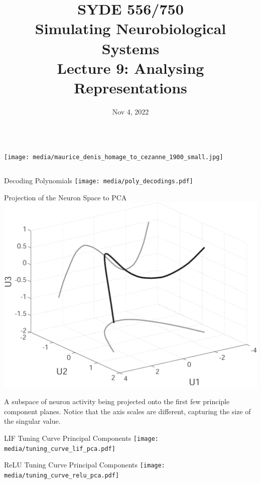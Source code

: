 \documentclass[handout,aspectratio=169]{beamer}
\date{Nov 4, 2022}
\title{SYDE 556/750 \\ Simulating Neurobiological Systems \\ Lecture 9: Analysing Representations}
\begin{document}
	
	\begin{frame}{}
		\vspace{0.5cm}
		\begin{columns}[c]
			\MakeTitle
			\texttt{[image: media/maurice\_denis\_homage\_to\_cezanne\_1900\_small.jpg]}
		\end{columns}
	\end{frame}

	\begin{frame}{Decoding Polynomials}
		\centering
		\texttt{[image: media/poly\_decodings.pdf]} 
	\end{frame}

  \begin{frame}{Projection of the Neuron Space to PCA}
    \centering
    \includegraphics[scale=.4]{media/c5.chi.projections.pdf}
    
    A subspace of neuron activity being projected onto the first few principle component planes. Notice that the axis scales are different, capturing the size of the singular value.
  \end{frame}

	\begin{frame}{LIF Tuning Curve Principal Components}
		\centering
		\texttt{[image: media/tuning\_curve\_lif\_pca.pdf]}
		\begin{overlayarea}{\textwidth}{0.5cm}
			\centering
		\end{overlayarea}
	\end{frame}

	\begin{frame}{ReLU Tuning Curve Principal Components}
		\centering
		\texttt{[image: media/tuning\_curve\_relu\_pca.pdf]}
		\begin{overlayarea}{\textwidth}{0.5cm}
			\centering
			\only<2->{\hl{$\approx$ Legendre Basis}}
		\end{overlayarea}
	\end{frame}
\end{document}
